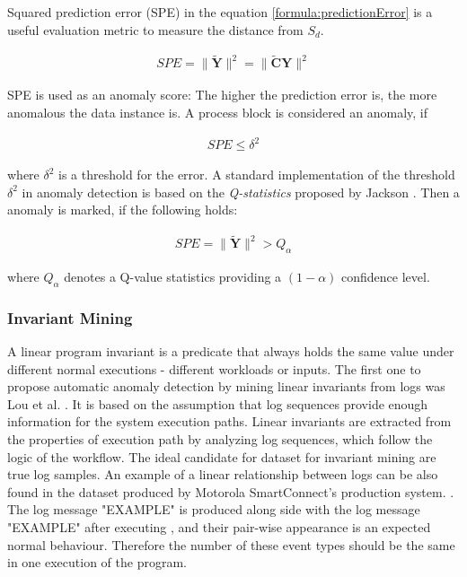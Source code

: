  Squared prediction error (SPE) in the equation \ref{formula:predictionError} is a useful evaluation metric to measure the distance from $S_d$. 
 
 \begin{gather}
     SPE = \parallel \mathbf{\widetilde{Y}} \parallel^2  = \parallel \mathbf{\widetilde{C}Y} \parallel^2
    \label{formula:predictionError}
\end{gather}

SPE is used as an anomaly score: The higher the prediction error is, the more anomalous the data instance is. A process block is considered an anomaly, if  

\begin{gather}
     SPE \leq \delta^2
\end{gather}

where $\delta^2$ is a threshold for the error. A standard implementation of the threshold  $\delta^2$ in anomaly detection is based on the \textit{Q-statistics} proposed by Jackson \cite{pcaJackson1979}. Then a anomaly is marked, if the following holds: 

\begin{gather}
    SPE = \parallel \mathbf{\widetilde{Y}} \parallel^2 > Q_{\alpha} 
\end{gather}
 
 where $Q_{\alpha}$ denotes a Q-value statistics providing a $(1 - \alpha)$ confidence level. 

 \subsubsection{Invariant Mining}
 
A linear program invariant is a predicate that always holds the same value under different normal executions - different workloads or inputs. The first one to propose automatic anomaly detection by mining linear invariants from logs was Lou et al. \cite{lou2010}. It is based on the assumption that log sequences provide enough information for the system execution paths. Linear invariants are extracted from the properties of execution path by analyzing log sequences, which follow the logic of the workflow. The ideal candidate for dataset for invariant mining are true log samples. An example of a linear relationship between logs can be also found in the dataset produced by Motorola SmartConnect's production system. . The log message "EXAMPLE" is produced along side with the log message "EXAMPLE" after executing , and their pair-wise appearance is an expected normal behaviour. Therefore the number of these event types should be the same in one execution of the program. 

